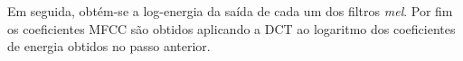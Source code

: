 Em seguida, obtém-se a log-energia da saída de cada um dos filtros \textit{mel}. Por fim os coeficientes MFCC são obtidos aplicando a DCT ao logaritmo dos coeficientes de energia obtidos no passo anterior.



























